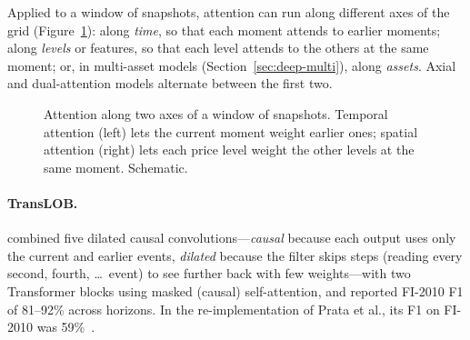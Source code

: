 Applied to a window of snapshots, attention can run along different axes of the grid
(Figure~\ref{fig:attn-axes}): along \emph{time}, so that each moment attends to earlier moments; along
\emph{levels} or features, so that each level attends to the others at the same moment; or, in multi-asset
models (Section~\ref{sec:deep-multi}), along \emph{assets}. Axial and dual-attention models alternate
between the first two.

\begin{figure}[!htbp]
\centering
{}
\caption{Attention along two axes of a window of snapshots. Temporal attention (left) lets the current
moment weight earlier ones; spatial attention (right) lets each price level weight the other levels at the
same moment. Schematic.}
\label{fig:attn-axes}
\end{figure}

\paragraph{TransLOB.} \citet{wallbridge2020} combined five dilated causal convolutions---\emph{causal} because each output
uses only the current and earlier events, \emph{dilated} because the filter skips steps (reading every second, fourth,
\ldots\ event) to see further back with few weights---with two Transformer blocks using masked (causal) self-attention, and reported FI-2010 F1 of 81--92\% across
horizons. In the re-implementation of Prata et al., its F1 on FI-2010 was 59\%~\citep{prata2024}.

